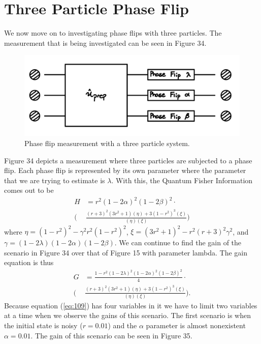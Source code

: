 \documentclass[twocolumn]{article}
\begin{document}
\section*{Three Particle Phase Flip}
We now move on to investigating phase flips with three particles. The measurement that is being investigated can be seen in Figure 34.
\begin{figure}[h]
\begin{center}
\includegraphics[width=0.65\linewidth]{Phase-Flip-Triple-Channel-Lambda-Schematic.jpg}
\caption{Phase flip measurement with a three particle system.}
\end{center}
\end{figure}
\newline
Figure 34 depicts a measurement where three particles are subjected to a phase flip. Each phase flip is represented by its own parameter where the parameter that we are trying to estimate is $\lambda$. With this, the Quantum Fisher Information comes out to be
\begin{align}\label{eq:108}
H&=r^2(1-2\alpha)^2(1-2\beta)^2\cdot \nonumber \\
\bigg(&\frac{(r+3)^2(3r^2+1)(\eta)+3(1-r^2)^3(\xi)}{(\eta)(\xi)}\bigg)
\end{align}
where $\eta=(1-r^2)^2-\gamma^2r^2(1-r^2)^2$, $\xi=(3r^2+1)^2-r^2(r+3)^2\gamma^2$, and $\gamma=(1-2\lambda)(1-2\alpha)(1-2\beta)$. We can continue to find the gain of the scenario in Figure 34 over that of Figure 15 with parameter lambda. The gain equation is thus
\begin{align}\label{eq:109}
G&=\frac{1-r^2(1-2\lambda)^2(1-2\alpha)^2(1-2\beta)^2}{4}\cdot \nonumber \\
\bigg(&\frac{(r+3)^2(3r^2+1)(\eta)+3(1-r^2)^3(\xi)}{(\eta)(\xi)}\bigg).
\end{align}
Because equation (\ref{eq:109}) has four variables in it we have to limit two variables at a time when we observe the gains of this scenario. The first scenario is when the initial state is noisy ($r=0.01$) and the $\alpha$ parameter is almost nonexistent $\alpha=0.01$. The gain of this scenario can be seen in Figure 35.
\end{document}
